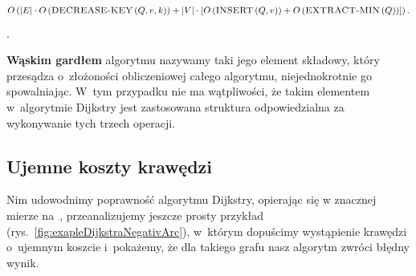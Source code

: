 \begin{equation}
	O \left( \left| E \right| \cdot O \left( \textrm{\textsc{DECREASE-KEY}} \left( Q, v, k \right) \right) + \left| V \right| \cdot \left[ O \left( \textrm{\textsc{INSERT}} \left( Q, v \right) \right) + O \left( \textrm{\textsc{EXTRACT-MIN}} \left( Q \right) \right) \right] \right)\textrm{.}
\end{equation}\label{eq:dijkstraComplexity}.

\textbf{Wąskim gardłem} algorytmu nazywamy taki jego element składowy, który przesądza o~złożoności obliczeniowej całego algorytmu, niejednokrotnie go spowalniając.
W~tym przypadku nie ma wątpliwości, że takim elementem w~algorytmie Dijkstry jest zastosowana struktura odpowiedzialna za wykonywanie tych trzech operacji.



\subsection{Ujemne koszty krawędzi}



Nim udowodnimy poprawność algorytmu Dijkstry, opierając się w znacznej mierze na~\cite[$24.6$]{Cormen}, przeanalizujemy jeszcze prosty przykład (rys.~\ref{fig:exapleDijkstraNegativArc}), w~którym dopuścimy wystąpienie krawędzi o~ujemnym koszcie i~pokażemy, że dla takiego grafu nasz algorytm zwróci błędny wynik.

